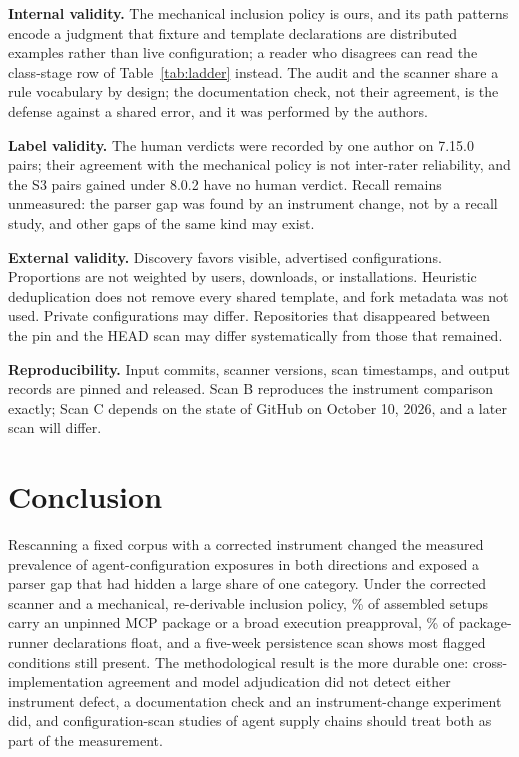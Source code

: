 \documentclass[10pt,conference]{IEEEtran}
\newcommand{\vold}{7.15.0}
\newcommand{\vnew}{8.0.2}
\newcommand{\pct}[1]{#1\%}
\begin{document}
\textbf{Internal validity.} The mechanical inclusion policy is ours, and its path patterns encode a judgment that fixture and template declarations are distributed examples rather than live configuration; a reader who disagrees can read the class-stage row of Table~\ref{tab:ladder} instead. The audit and the scanner share a rule vocabulary by design; the documentation check, not their agreement, is the defense against a shared error, and it was performed by the authors.

\textbf{Label validity.} The human verdicts were recorded by one author on \vold{} pairs; their agreement with the mechanical policy is not inter-rater reliability, and the S3 pairs gained under \vnew{} have no human verdict. Recall remains unmeasured: the parser gap was found by an instrument change, not by a recall study, and other gaps of the same kind may exist.

\textbf{External validity.} Discovery favors visible, advertised configurations. Proportions are not weighted by users, downloads, or installations. Heuristic deduplication does not remove every shared template, and fork metadata was not used. Private configurations may differ. Repositories that disappeared between the pin and the HEAD scan may differ systematically from those that remained.

\textbf{Reproducibility.} Input commits, scanner versions, scan timestamps, and output records are pinned and released. Scan B reproduces the instrument comparison exactly; Scan C depends on the state of GitHub on October 10, 2026, and a later scan will differ.

\section{Conclusion}

Rescanning a fixed corpus with a corrected instrument changed the measured prevalence of agent-configuration exposures in both directions and exposed a parser gap that had hidden a large share of one category. Under the corrected scanner and a mechanical, re-derivable inclusion policy, \pct{\AnySSetupsPct} of \NSetups{} assembled setups carry an unpinned MCP package or a broad execution preapproval, \pct{\DeclPctUnpinnedOrTag} of package-runner declarations float, and a five-week persistence scan shows most flagged conditions still present. The methodological result is the more durable one: cross-implementation agreement and model adjudication did not detect either instrument defect, a documentation check and an instrument-change experiment did, and configuration-scan studies of agent supply chains should treat both as part of the measurement.
\end{document}
